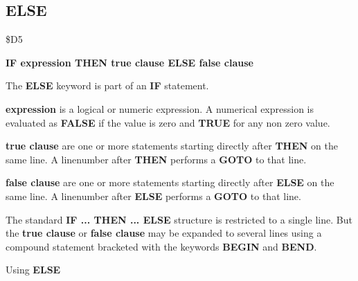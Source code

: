 \subsection{ELSE}
\begin{description}[leftmargin=3cm,style=nextline]
\item [Token:] \$D5
\item [Format:] {\bf IF expression THEN true clause ELSE false clause}
\item [Usage:] The {\bf ELSE} keyword is part of an {\bf IF}
               statement.

               {\bf expression} is a logical or numeric expression.
               A numerical expression is evaluated as {\bf FALSE}
               if the value is zero and {\bf TRUE} for any non zero
               value.

               {\bf true clause} are one or more statements starting
               directly after {\bf THEN} on the same line.
               A linenumber after {\bf THEN} performs a
               {\bf GOTO} to that line.

               {\bf false clause} are one or more statements starting
               directly after {\bf ELSE} on the same line.
               A linenumber after {\bf ELSE} performs a
               {\bf GOTO} to that line.

\item [Remarks:]
               The standard {\bf IF ... THEN ... ELSE} structure
               is restricted to a single line. But the {\bf true clause}
               or {\bf false clause} may be expanded to several lines
               using a compound statement bracketed with the keywords
               {\bf BEGIN} and {\bf BEND}.
\item [Example:]
                Using {\bf ELSE}
\end{description}



\newpage
